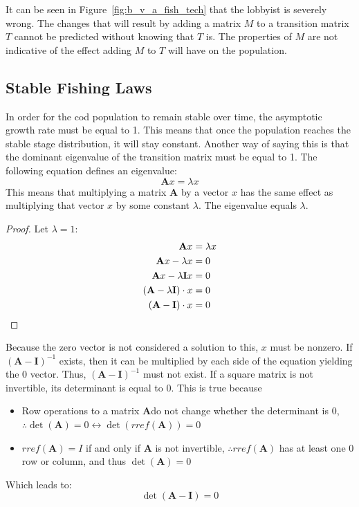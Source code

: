 \documentclass{article}
\begin{document}
    It can be seen in Figure~\ref{fig:b_v_a_fish_tech} that the lobbyist is severely wrong.
    The changes that will result by adding a matrix $M$ to a transition matrix $T$ cannot be predicted without knowing that $T$ is.
    The properties of $M$ are not indicative of the effect adding $M$ to $T$ will have on the population.

    \subsection{Stable Fishing Laws}\label{subsec:stable-fishing-laws}

    In order for the cod population to remain stable over time, the asymptotic growth rate must be equal to 1.
    This means that once the population reaches the stable stage distribution, it will stay constant.
    Another way of saying this is that the dominant eigenvalue of the transition matrix must be equal to 1.
    The following equation defines an eigenvalue:
    \begin{equation}
        \textbf{A}x = \lambda x\label{eq:equation16}
    \end{equation}
    This means that multiplying a matrix $\textbf{A}$ by a vector $x$ has the same effect as multiplying that vector $x$ by some constant $\lambda$.
    The eigenvalue equals $\lambda$.
    \begin{proof}
        Let $\lambda = 1$:
        \begin{align*}
            \textbf{A}x &= \lambda x \\
            \textbf{A}x - \lambda x &= 0 \\
            \textbf{A}x - \lambda\textbf{I}x &= 0 \\
            (\textbf{A} - \lambda\textbf{I})\cdot x &= 0 \\
            (\textbf{A} - \textbf{I})\cdot x &= 0 \qedhere
        \end{align*}
    \end{proof}
    \noindent Because the zero vector is not considered a solution to this, $x$ must be nonzero.
    If $(\textbf{A} - \textbf{I})^{-1}$ exists, then it can be multiplied by each side of the equation yielding the 0 vector.
    Thus, $(\textbf{A} - \textbf{I})^{-1}$ must not exist.
    If a square matrix is not invertible, its determinant is equal to 0.
    This is true because
    \begin{itemize}
        \item Row operations to a matrix $\textbf{A}$do not change whether the determinant is 0, $\therefore \det(\textbf{A}) = 0 \leftrightarrow \det(rref(\textbf{A})) = 0$~\cite{towers_24_nodate}
        \item $rref(\textbf{A}) = I$ if and only if $\textbf{A}$ is not invertible, $\therefore rref(\textbf{A})$ has at least one 0 row or column, and thus $\det(\textbf{A}) = 0$~\cite{towers_24_nodate}
    \end{itemize}
    Which leads to:
    \begin{equation}
        \det(\textbf{A} - \textbf{I}) = 0\label{eq:equation17}
    \end{equation}
\end{document}
